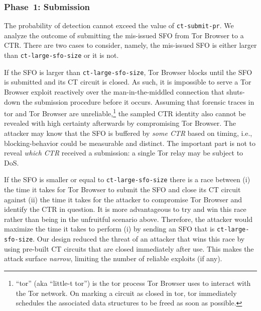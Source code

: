 
\subsubsection{Phase~1: Submission} \label{sec:analysis:pr:phase1}
The probability of detection cannot exceed the value of \texttt{ct-submit-pr}.
We analyze the outcome of submitting the mis-issued SFO from Tor Browser to a
CTR.  There are two cases to consider, namely, the mis-issued SFO is either
larger than \texttt{ct-large-sfo-size} or it is not.

If the SFO is larger than \texttt{ct-large-sfo-size}, Tor Browser blocks until
the SFO is submitted and its CT circuit is closed.  As such, it is impossible to
serve a Tor Browser exploit reactively over the man-in-the-middled connection
that shuts-down the submission procedure before it occurs.  Assuming that
forensic traces in tor and Tor Browser are unreliable,\footnote{%
	``tor'' (aka ``little-t tor'') is the tor process Tor Browser uses to
	interact with the Tor network.  On marking a circuit as closed in tor, tor
	immediately schedules the associated data structures to be freed as soon as
	possible.
} the sampled CTR identity also cannot be revealed with high certainty
afterwards by compromising Tor Browser.  The attacker may know that the SFO is
buffered by \emph{some CTR} based on timing, i.e., blocking-behavior could be 
measurable and distinct.  The important part is not to reveal \emph{which CTR}
received a submission:  a single Tor relay may be subject to DoS.

If the SFO is smaller or equal to \texttt{ct-large-sfo-size} there is a
race between (i) the time it takes for Tor Browser to submit the SFO and close
its CT circuit against (ii) the time it takes for the attacker to compromise Tor
Browser and identify the CTR in question.  It is more advantageous to try and
win this race rather than being in the unfruitful scenario above.  Therefore,
the attacker would maximize the time it takes to perform (i) by sending an SFO
that is \texttt{ct-large-sfo-size}.  Our design reduced the threat of an
attacker that wins this race by using pre-built CT circuits that are closed
immediately after use.  This makes the attack surface \emph{narrow}, limiting
the number of reliable exploits (if any).

